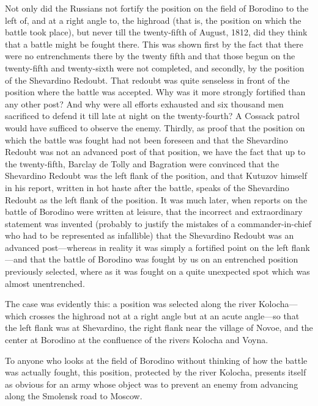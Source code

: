 Not only did the Russians not fortify the position on the field
of Borodino to the left of, and at a right angle to, the highroad
(that is, the position on which the battle took place), but never
till the twenty-fifth of August, 1812, did they think that a
battle might be fought there. This was shown first by the fact
that there were no entrenchments there by the twenty fifth and
that those begun on the twenty-fifth and twenty-sixth were not
completed, and secondly, by the position of the Shevardino
Redoubt. That redoubt was quite senseless in front of the
position where the battle was accepted. Why was it more strongly
fortified than any other post? And why were all efforts exhausted
and six thousand men sacrificed to defend it till late at night
on the twenty-fourth? A Cossack patrol would have sufficed to
observe the enemy. Thirdly, as proof that the position on which
the battle was fought had not been foreseen and that the
Shevardino Redoubt was not an advanced post of that position, we
have the fact that up to the twenty-fifth, Barclay de Tolly and
Bagration were convinced that the Shevardino Redoubt was the left
flank of the position, and that Kutuzov himself in his report,
written in hot haste after the battle, speaks of the Shevardino
Redoubt as the left flank of the position. It was much later,
when reports on the battle of Borodino were written at leisure,
that the incorrect and extraordinary statement was invented
(probably to justify the mistakes of a commander-in-chief who had
to be represented as infallible) that the Shevardino Redoubt was
an advanced post---whereas in reality it was simply a fortified
point on the left flank---and that the battle of Borodino was
fought by us on an entrenched position previously selected, where
as it was fought on a quite unexpected spot which was almost
unentrenched.

The case was evidently this: a position was selected along the
river Kolocha---which crosses the highroad not at a right angle
but at an acute angle---so that the left flank was at Shevardino,
the right flank near the village of Novoe, and the center at
Borodino at the confluence of the rivers Kolocha and Voyna.

To anyone who looks at the field of Borodino without thinking of
how the battle was actually fought, this position, protected by
the river Kolocha, presents itself as obvious for an army whose
object was to prevent an enemy from advancing along the Smolensk
road to Moscow.

